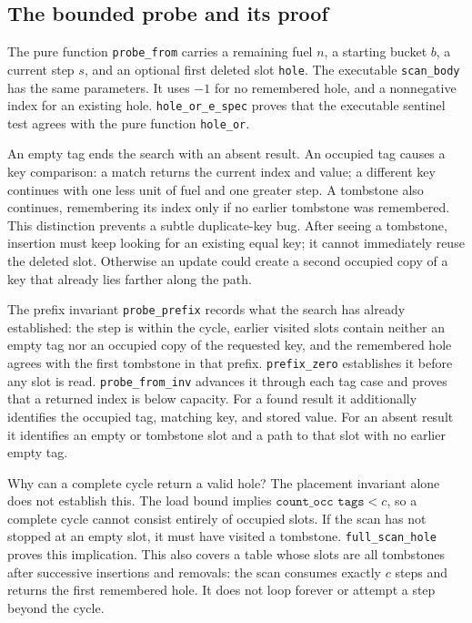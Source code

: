 \documentclass[11pt]{article}
\begin{document}
\subsection{The bounded probe and its proof}

The pure function \texttt{probe\_from} carries a remaining fuel $n$, a starting
bucket $b$, a current step $s$, and an optional first deleted slot
\texttt{hole}. The executable \texttt{scan\_body} has the same parameters.
It uses $-1$ for no remembered hole, and a nonnegative index for an existing
hole. \texttt{hole\_or\_e\_spec} proves that the executable sentinel test agrees
with the pure function \texttt{hole\_or}.

An empty tag ends the search with an absent result. An occupied tag causes a
key comparison: a match returns the current index and value; a different key
continues with one less unit of fuel and one greater step. A tombstone also
continues, remembering its index only if no earlier tombstone was remembered.
This distinction prevents a subtle duplicate-key bug. After seeing a tombstone,
insertion must keep looking for an existing equal key; it cannot immediately
reuse the deleted slot. Otherwise an update could create a second occupied copy
of a key that already lies farther along the path.

The prefix invariant \texttt{probe\_prefix} records what the search has already
established: the step is within the cycle, earlier visited slots contain neither
an empty tag nor an occupied copy of the requested key, and the remembered hole
agrees with the first tombstone in that prefix. \texttt{prefix\_zero}
establishes it before any slot is read. \texttt{probe\_from\_inv} advances it
through each tag case and proves that a returned index is below capacity.
For a found result it additionally identifies the occupied tag, matching key,
and stored value. For an absent result it identifies an empty or tombstone slot
and a path to that slot with no earlier empty tag.

Why can a complete cycle return a valid hole? The placement invariant alone
does not establish this. The load bound implies
$\texttt{count\_occ tags}<c$, so a complete cycle cannot consist entirely of
occupied slots. If the scan has not stopped at an empty slot, it must have
visited a tombstone. \texttt{full\_scan\_hole} proves this implication. This also
covers a table whose slots are all tombstones after successive insertions and
removals: the scan consumes exactly $c$ steps and returns the first remembered
hole. It does not loop forever or attempt a step beyond the cycle.
\end{document}
